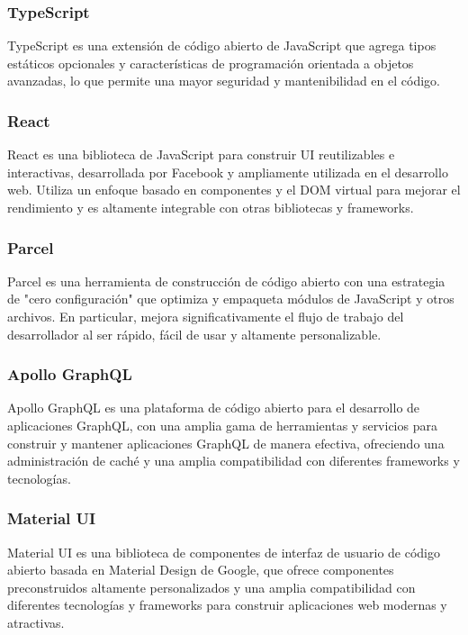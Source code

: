 \subsubsection{TypeScript}

TypeScript \citep{typescript} es una extensión de código abierto de JavaScript que agrega tipos estáticos opcionales y características de programación orientada a objetos avanzadas, lo que permite una mayor seguridad y mantenibilidad en el código. 


\subsubsection{React}

React \citep{react} es una biblioteca de JavaScript para construir UI reutilizables e interactivas, desarrollada por Facebook y ampliamente utilizada en el desarrollo web. Utiliza un enfoque basado en componentes y el DOM virtual para mejorar el rendimiento y es altamente integrable con otras bibliotecas y frameworks.


\subsubsection{Parcel}

Parcel \citep{parcel} es una herramienta de construcción de código abierto con una estrategia de "cero configuración" que optimiza y empaqueta módulos de JavaScript y otros archivos. En particular, mejora significativamente el flujo de trabajo del desarrollador al ser rápido, fácil de usar y altamente personalizable.


\subsubsection{Apollo GraphQL}

Apollo GraphQL \citep{apollo-graphql} es una plataforma de código abierto para el desarrollo de aplicaciones GraphQL, con una amplia gama de herramientas y servicios para construir y mantener aplicaciones GraphQL de manera efectiva, ofreciendo una administración de caché y una amplia compatibilidad con diferentes frameworks y tecnologías.


\subsubsection{Material UI}

Material UI \citep{material-ui} es una biblioteca de componentes de interfaz de usuario de código abierto basada en Material Design de Google, que ofrece componentes preconstruidos altamente personalizados y una amplia compatibilidad con diferentes tecnologías y frameworks para construir aplicaciones web modernas y atractivas.


